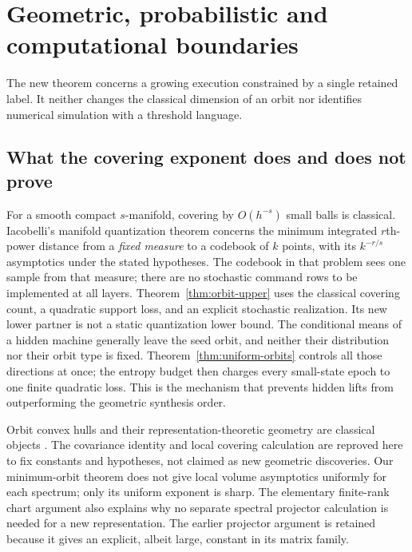 \section{Geometric, probabilistic and computational boundaries}
\label{sec:comparison}
The new theorem concerns a growing execution constrained by a single
retained label. It neither changes the classical dimension of an orbit
nor identifies numerical simulation with a threshold language.

\subsection{What the covering exponent does and does not prove}
For a smooth compact $s$-manifold, covering by $O(h^{-s})$ small balls
is classical. Iacobelli's manifold quantization theorem
\cite[Theorem 1.4]{Iacobelli} concerns the minimum integrated
$r$th-power distance from a \emph{fixed measure} to a codebook of
$k$ points, with its $k^{-r/s}$ asymptotics under the stated hypotheses.
The codebook in that problem sees one sample from that measure;
there are no stochastic command rows to be implemented at all layers.
Theorem~\ref{thm:orbit-upper} uses the classical covering count, a
quadratic support loss, and an explicit stochastic realization. Its
new lower partner is not a static quantization lower bound. The
conditional means of a hidden machine generally leave the seed orbit,
and neither their distribution nor their orbit type is fixed.
Theorem~\ref{thm:uniform-orbits} controls all those directions at once;
the entropy budget then charges every small-state epoch to one finite
quadratic loss. This is the mechanism that prevents hidden lifts from
outperforming the geometric synthesis order.

Orbit convex hulls and their representation-theoretic geometry are
classical objects \cite{Barvinok,Orbitopes}. The covariance identity
and local covering calculation are reproved here to fix constants
and hypotheses, not claimed as new geometric discoveries. Our
minimum-orbit theorem does not give local volume asymptotics uniformly
for each spectrum; only its uniform exponent is sharp. The elementary
finite-rank chart argument also explains why no separate spectral
projector calculation is needed for a new representation. The earlier
projector argument is retained because it gives an explicit, albeit
large, constant in its matrix family.

